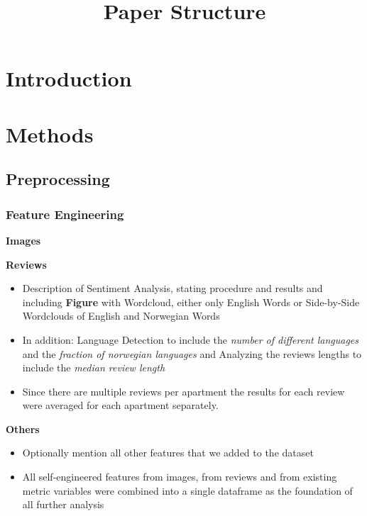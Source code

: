 \documentclass[12pt, letterpaper]{article}
\title{Paper Structure}
\author{}
\date{}
\begin{document}
\maketitle
\tableofcontents
\setcounter{tocdepth}{3}

\section{Introduction} %

\section{Methods} %

\subsection{Preprocessing} %

\subsubsection{Feature Engineering} %

\textbf{Images} %

\textbf{Reviews} %
\begin{itemize}
    \item Description of Sentiment Analysis, stating procedure and results and including \textbf{Figure} with Wordcloud, either only English Words or Side-by-Side Wordclouds of English and Norwegian Words
    \item In addition: Language Detection to include the \emph{number of different languages} and the \emph{fraction of norwegian languages} and Analyzing the reviews lengths to include the \emph{median review length}
    \item Since there are multiple reviews per apartment the results for each review were averaged for each apartment separately.
\end{itemize}

\textbf{Others} %
\begin{itemize}
    \item Optionally mention all other features that we added to the dataset
    \item All self-engineered features from images, from reviews and from existing metric variables were combined into a single dataframe as the foundation of all further analysis
\end{itemize}
\end{document}
